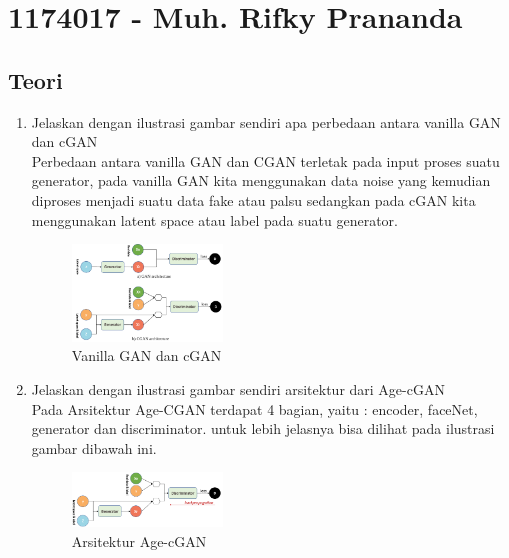\section{1174017 - Muh. Rifky Prananda}

\subsection{Teori}
\begin{enumerate}
\item Jelaskan dengan ilustrasi gambar sendiri apa perbedaan antara vanilla GAN dan cGAN\\
Perbedaan antara vanilla GAN dan CGAN terletak pada input proses suatu generator, pada vanilla GAN kita menggunakan data noise yang kemudian diproses menjadi suatu data fake atau palsu sedangkan pada cGAN kita menggunakan latent space atau label pada suatu generator. 
\begin{figure}[H]
	\includegraphics[width=4cm]{figures/1174017/9/1.png}
	\centering
	\caption{Vanilla GAN dan cGAN}
\end{figure}

\item Jelaskan dengan ilustrasi gambar sendiri arsitektur dari Age-cGAN\\
Pada Arsitektur Age-CGAN terdapat 4 bagian, yaitu : encoder, faceNet, generator dan discriminator.
untuk lebih jelasnya bisa dilihat pada ilustrasi gambar dibawah ini.
\begin{figure}[H]
	\includegraphics[width=4cm]{figures/1174017/9/2.png}
	\centering
	\caption{Arsitektur Age-cGAN}
\end{figure}


\end{enumerate}
